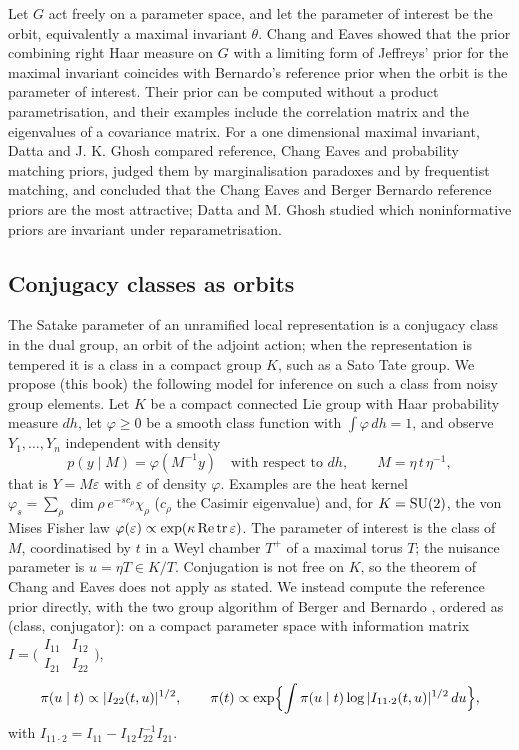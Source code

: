 Let $G$ act freely on a parameter space, and let the parameter of interest be the orbit, equivalently a maximal invariant $\theta$. Chang and Eaves \cite{changeaves1990} showed that the prior combining right Haar measure on $G$ with a limiting form of Jeffreys' prior for the maximal invariant coincides with Bernardo's reference prior \cite{bernardo1979,bergerbernardo1992} when the orbit is the parameter of interest. Their prior can be computed without a product parametrisation, and their examples include the correlation matrix and the eigenvalues of a covariance matrix. For a one dimensional maximal invariant, Datta and J. K. Ghosh \cite{dattaghosh1995} compared reference, Chang Eaves and probability matching priors, judged them by marginalisation paradoxes and by frequentist matching, and concluded that the Chang Eaves and Berger Bernardo reference priors are the most attractive; Datta and M. Ghosh \cite{dattaghosh1996} studied which noninformative priors are invariant under reparametrisation.

\subsection{Conjugacy classes as orbits}

The Satake parameter of an unramified local representation is a conjugacy class in the dual group, an orbit of the adjoint action; when the representation is tempered it is a class in a compact group $K$, such as a Sato Tate group. We propose (this book) the following model for inference on such a class from noisy group elements. Let $K$ be a compact connected Lie group with Haar probability measure $dh$, let $\varphi\ge0$ be a smooth class function with $\int\varphi\,dh=1$, and observe $Y_1,\dots,Y_n$ independent with density
\begin{equation}\label{eq:11bnoise}
p(y\mid M)=\varphi(M^{-1}y)\quad\text{with respect to }dh,\qquad M=\eta\,t\,\eta^{-1},
\end{equation}
that is $Y=M\varepsilon$ with $\varepsilon$ of density $\varphi$. Examples are the heat kernel $\varphi_s=\sum_\rho\dim\rho\,e^{-sc_\rho}\chi_\rho$ ($c_\rho$ the Casimir eigenvalue) and, for $K=\mathrm{SU}(2)$, the von Mises Fisher law $\varphi(\varepsilon)\propto\exp(\kappa\operatorname{Re}\operatorname{tr}\varepsilon)$. The parameter of interest is the class of $M$, coordinatised by $t$ in a Weyl chamber $T^+$ of a maximal torus $T$; the nuisance parameter is $u=\eta T\in K/T$. Conjugation is not free on $K$, so the theorem of Chang and Eaves does not apply as stated. We instead compute the reference prior directly, with the two group algorithm of Berger and Bernardo \cite{bergerbernardo1992}, ordered as (class, conjugator): on a compact parameter space with information matrix $I=\bigl(\begin{smallmatrix}I_{11}&I_{12}\\I_{21}&I_{22}\end{smallmatrix}\bigr)$,
\begin{equation}\label{eq:11bbb}
\pi(u\mid t)\propto|I_{22}(t,u)|^{1/2},\qquad \pi(t)\propto\exp\Bigl\{\int\pi(u\mid t)\log|I_{11\cdot2}(t,u)|^{1/2}\,du\Bigr\},
\end{equation}
with $I_{11\cdot2}=I_{11}-I_{12}I_{22}^{-1}I_{21}$.


